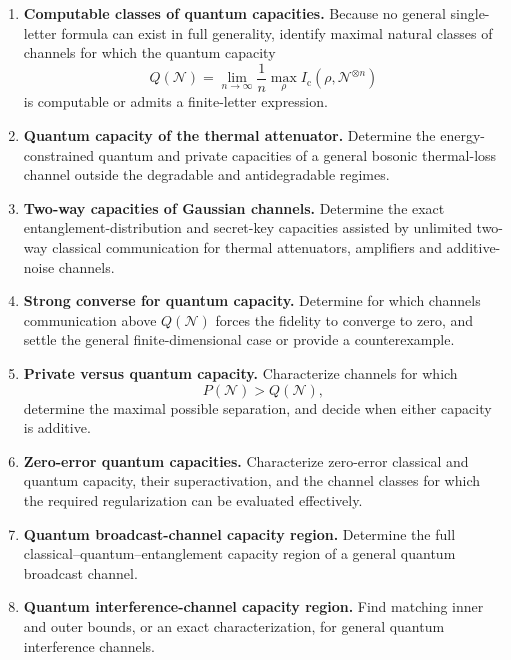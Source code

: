 \documentclass{article}
\begin{document}
\begin{enumerate}[label=\textbf{C\arabic*.},leftmargin=*]

\item \precise{} \textbf{Computable classes of quantum capacities.}
Because no general single-letter formula can exist in full generality,
identify maximal natural classes of channels for which the quantum
capacity
\[
    Q(\mathcal N)
      =\lim_{n\to\infty}\frac1n
       \max_{\rho} I_{\mathrm c}(\rho,\mathcal N^{\otimes n})
\]
is computable or admits a finite-letter expression.

\item \precise{} \textbf{Quantum capacity of the thermal attenuator.}
Determine the energy-constrained quantum and private capacities of a
general bosonic thermal-loss channel outside the degradable and
antidegradable regimes.

\item \precise{} \textbf{Two-way capacities of Gaussian channels.}
Determine the exact entanglement-distribution and secret-key
capacities assisted by unlimited two-way classical communication for
thermal attenuators, amplifiers and additive-noise channels.

\item \precise{} \textbf{Strong converse for quantum capacity.}
Determine for which channels communication above \(Q(\mathcal N)\)
forces the fidelity to converge to zero, and settle the general
finite-dimensional case or provide a counterexample.

\item \precise{} \textbf{Private versus quantum capacity.}
Characterize channels for which
\[
    P(\mathcal N)>Q(\mathcal N),
\]
determine the maximal possible separation, and decide when either
capacity is additive.

\item \precise{} \textbf{Zero-error quantum capacities.}
Characterize zero-error classical and quantum capacity, their
superactivation, and the channel classes for which the required
regularization can be evaluated effectively.

\item \precise{} \textbf{Quantum broadcast-channel capacity region.}
Determine the full classical--quantum--entanglement capacity region of
a general quantum broadcast channel.

\item \precise{} \textbf{Quantum interference-channel capacity region.}
Find matching inner and outer bounds, or an exact characterization, for
general quantum interference channels.


\end{enumerate}
\end{document}
